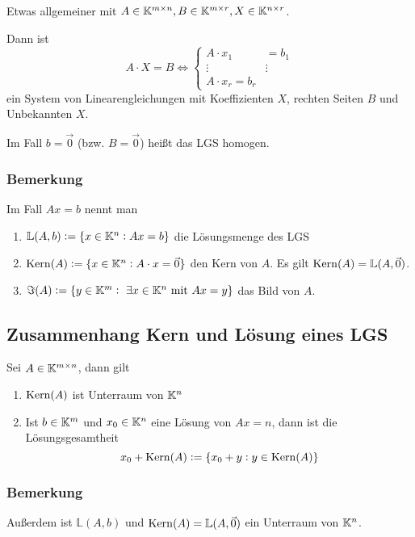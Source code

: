 Etwas allgemeiner mit $A \in \mathbb{K}^{m \times n}, B \in \mathbb{K}^{m \times r},
X \in \mathbb{K}^{n \times r}$.

Dann ist
\begin{equation*}
    A \cdot X = B \Leftrightarrow
    \begin{cases}
        A \cdot x_1 & = b_1\\
        \vdots & \vdots \\
        A \cdot x_r = b_r
    \end{cases}
\end{equation*}
ein System von Linearengleichungen mit Koeffizienten $X$, rechten Seiten $B$
und Unbekannten $X$.

Im Fall $b=\vec{0}$ (bzw. $B = \vec{0}$) heißt das LGS homogen.

\subsubsection{Bemerkung}
Im Fall $A x = b$ nennt man
\begin{enumerate}[label= (\alph*)]
    \item $\mathbb{L}(A, b) := \{ x \in \mathbb{K}^n: A x = b \}$ die Lösungsmenge des
        LGS
    \item $\operatorname{Kern}(A) := \{ x \in \mathbb{K}^n: A \cdot x = \vec{0}\}$ den Kern von $A$.
        Es gilt $\operatorname{Kern}(A) = \mathbb{L}(A,\vec{0})$.
    \item $\Im(A) := \{ y \in \mathbb{K}^m:\ \exists x \in \mathbb{K}^n \text{ mit } A x = y\}$
        das Bild von $A$.
\end{enumerate}

\subsection{Zusammenhang Kern und Lösung eines LGS}
Sei $A \in \mathbb{K}^{m \times n}$, dann gilt
\begin{enumerate}[label= (\alph*)]
    \item $\operatorname{Kern}(A)$ ist Unterraum von $\mathbb{K}^n$
    \item Ist $b \in \mathbb{K}^m$ und $x_0 \in \mathbb{K}^n$ eine Lösung von $Ax=n$, dann ist
        die Lösungsgesamtheit
        \begin{equation*}
            x_0 + \operatorname{Kern}(A) := \{ x_0 + y: y \in \operatorname{Kern}(A) \}
        \end{equation*}
\end{enumerate}

\subsubsection{Bemerkung}
Außerdem ist $\mathbb{L}(A,b)$ und $\operatorname{Kern}(A) = \mathbb{L}(A,\vec{0})$
ein Unterraum von $\mathbb{K}^n$.

